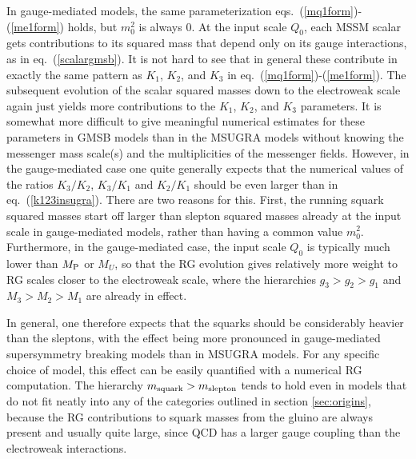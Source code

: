 \documentclass[12pt]{article}
\def\MPlanck{M_{\rm P}}
\begin{document}
In gauge-mediated models, the same parameterization 
eqs.~(\ref{mq1form})-(\ref{me1form}) holds, but $m_0^2$ is always 0. At 
the input scale $Q_0$, each MSSM scalar gets contributions to its squared 
mass that depend only on its gauge interactions, as in 
eq.~(\ref{scalargmsb}). It is not hard to see that in general these 
contribute in exactly the same pattern as $K_1$, $K_2$, and $K_3$ in 
eq.~(\ref{mq1form})-(\ref{me1form}). The subsequent evolution of the 
scalar squared masses down to the electroweak scale again just yields more 
contributions to the $K_1$, $K_2$, and $K_3$ parameters. It is somewhat 
more difficult to give meaningful numerical estimates for these parameters 
in GMSB models than in the MSUGRA models without 
knowing the messenger mass scale(s) and the multiplicities of the 
messenger fields. However, in the gauge-mediated case one quite generally 
expects that the numerical values of the ratios $K_3/K_2$, $K_3/K_1$ and 
$K_2/K_1$ should be even larger than in eq.~(\ref{k123insugra}). There are 
two reasons for this. First, the running squark squared masses start off 
larger than slepton squared masses already at the input scale in 
gauge-mediated models, rather than having a common value $m_0^2$. 
Furthermore, in the gauge-mediated case, the input scale $Q_0$ is 
typically much lower than $\MPlanck$ or $M_U$, so that the RG evolution 
gives 
relatively more weight to RG scales closer to the electroweak scale, where 
the hierarchies $g_3>g_2>g_1$ and $M_3>M_2>M_1$ are already in effect.

In general, one therefore expects that the squarks should be considerably 
heavier than the sleptons, with the effect being more pronounced in 
gauge-mediated supersymmetry breaking models than in MSUGRA 
models. For any specific choice of model, this effect can be easily 
quantified with a numerical RG computation. 
The hierarchy $m_{\rm squark} > m_{\rm 
slepton}$ tends to hold even in models that do not fit neatly into any of 
the categories outlined in section \ref{sec:origins}, because the RG 
contributions to squark masses from the gluino are always present and 
usually quite large, since QCD has a larger gauge coupling than the 
electroweak interactions.
\end{document}
